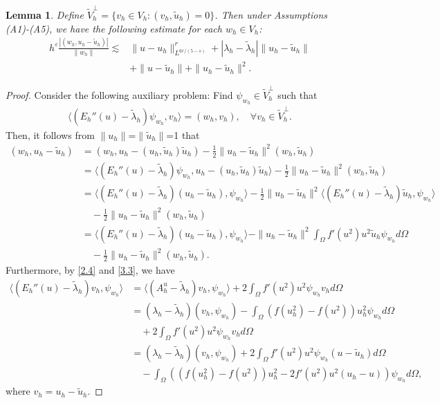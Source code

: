 \documentclass[compress, preprint,9pt]{elsarticle}
\numberwithin{equation}{section}
\newtheorem{lemma}{Lemma}[section]
\newcommand{\eps}{\varepsilon}
\newcommand{\la}{\langle}
\newcommand{\ran}{\rangle}
\begin{document}
\begin{lemma}
	Define $\widetilde{V}_h^\perp=\{v_h\in V_h:(v_h,\widetilde{u}_h)=0\}$. Then under Assumptions (A1)-(A5), we have the following estimate for each $w_h\in V_h$:
	\begin{equation}\label{3.20}
		\begin{aligned}
			h^\eps\frac{|(w_h,u_h-\widetilde{u}_h)|}{\|w_h\|}\lesssim& \|u-u_h\|^r_{L^{6r/(5-s)}}+|\lambda_h-\widetilde{\lambda}_h|\|u_h-\widetilde{u}_h\|\\
			\quad&+\|u-\widetilde{u}_h\|+\|u_h-\widetilde{u}_h\|^2.
		\end{aligned}
	\end{equation}
\end{lemma}
\begin{proof}
	Consider the following auxiliary problem: Find $\psi_{w_h}\in \widetilde{V}_h^\perp$ such that
	\begin{eqnarray*}
		\la (E_h''(u) -\widetilde{\lambda}_h)\psi_{w_h}, v_h\ran=(w_h,v_h),\quad\forall  v_h\in \widetilde{V}_h^\perp.
	\end{eqnarray*}
	Then, it follows from $\|u_h\|$=$\|\widetilde{u}_h\|$=1 that
	\begin{eqnarray*}
		(w_h,u_h-\widetilde{u}_h)&=(w_h,u_h-(u_h,\widetilde{u}_h)\widetilde{u}_h)-\frac12\|u_h-\widetilde{u}_h\|^2(w_h,\widetilde{u}_h)
		\\
		&=\la (E_h''(u) -\widetilde{\lambda}_h)\psi_{w_h}, u_h-(u_h,\widetilde{u}_h)\widetilde{u}_h\ran-\frac12\|u_h-\widetilde{u}_h\|^2(w_h,\widetilde{u}_h)
		\\
		&=\la (E_h''(u) -\widetilde{\lambda}_h)(u_h-\widetilde{u}_h),\psi_{w_h} \ran-\frac12\|u_h-\widetilde{u}_h\|^2\la (E_h''(u) -\widetilde{\lambda}_h)\widetilde{u}_h,\psi_{w_h}\ran
		\\
		&\quad-\frac12\|u_h-\widetilde{u}_h\|^2(w_h,\widetilde{u}_h)
		\\
		&=\la (E_h''(u) -\widetilde{\lambda}_h)(u_h-\widetilde{u}_h),\psi_{w_h} \ran-\|u_h-\widetilde{u}_h\|^2\int_\Omega f'(u^2)u^2\widetilde{u}_h\psi_{w_h}d\Omega
		\\
		&\quad-\frac12\|u_h-\widetilde{u}_h\|^2(w_h,\widetilde{u}_h).
	\end{eqnarray*}
	Furthermore, by \eqref{2.4} and \eqref{3.3}, we have
	\begin{eqnarray*}
		\la (E_h''(u) -\widetilde{\lambda}_h)v_h,\psi_{w_h} \ran&=\la (A_h^u -\widetilde{\lambda}_h)v_h,\psi_{w_h} \ran+2\int_\Omega f'(u^2)u^2\psi_{w_h}v_h d\Omega
		\\
		&=(\lambda_h -\widetilde{\lambda}_h)(v_h,\psi_{w_h})-\int_\Omega(f(u_h^2)-f(u^2))u_h^2\psi_{w_h} d\Omega
		\\
		&\quad+2\int_\Omega f'(u^2)u^2\psi_{w_h}v_h d\Omega
		\\
		&=(\lambda_h -\widetilde{\lambda}_h)(v_h,\psi_{w_h})+2\int_\Omega f'(u^2)u^2\psi_{w_h}(u-\widetilde{u}_h) d\Omega
		\\
		&\quad-\int_\Omega \left((f(u_h^2)-f(u^2))u_h^2-2f'(u^2)u^2(u_h-u)\right)\psi_{w_h} d\Omega,
	\end{eqnarray*}
	where $v_h=u_h-\widetilde{u}_h$.
	

\end{proof}
\end{document}
